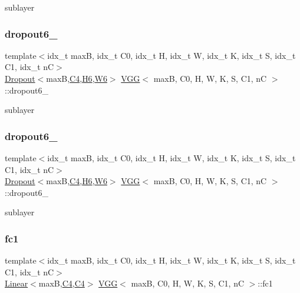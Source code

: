 sublayer \mbox{\label{structVGG_a3ed68e318387ff7e87b1c0d957d8d24a}} 
\subsubsection{\texorpdfstring{dropout6\+\_}{dropout6\_1}}
{\footnotesize\ttfamily template$<$idx\+\_\+t maxB, idx\+\_\+t C0, idx\+\_\+t H, idx\+\_\+t W, idx\+\_\+t K, idx\+\_\+t S, idx\+\_\+t C1, idx\+\_\+t nC$>$ \\
\hyperlink{structDropout}{Dropout}$<$maxB,\hyperlink{structVGG_a4d54a1cc3e99340dfb67e7252719c663}{C4},\hyperlink{structVGG_aca7e136480c1e76d74bda917c1ddca97}{H6},\hyperlink{structVGG_ada7bec62e12fac368b103ae3d8c59c0e}{W6}$>$ \hyperlink{structVGG}{V\+GG}$<$ maxB, C0, H, W, K, S, C1, nC $>$\+::dropout6\+\_}

sublayer \mbox{\label{structVGG_abecd584b5b4bf336077b181e4f3e6f50}} 
\subsubsection{\texorpdfstring{dropout6\+\_}{dropout6\_2}}
{\footnotesize\ttfamily template$<$idx\+\_\+t maxB, idx\+\_\+t C0, idx\+\_\+t H, idx\+\_\+t W, idx\+\_\+t K, idx\+\_\+t S, idx\+\_\+t C1, idx\+\_\+t nC$>$ \\
\hyperlink{structDropout}{Dropout}$<$maxB,\hyperlink{structVGG_a4d54a1cc3e99340dfb67e7252719c663}{C4},\hyperlink{structVGG_aca7e136480c1e76d74bda917c1ddca97}{H6},\hyperlink{structVGG_ada7bec62e12fac368b103ae3d8c59c0e}{W6}$>$ \hyperlink{structVGG}{V\+GG}$<$ maxB, C0, H, W, K, S, C1, nC $>$\+::dropout6\+\_}

sublayer \mbox{\label{structVGG_aca67ef058fa46d4f74022f308c72ad6c}} 
\subsubsection{\texorpdfstring{fc1}{fc1}}
{\footnotesize\ttfamily template$<$idx\+\_\+t maxB, idx\+\_\+t C0, idx\+\_\+t H, idx\+\_\+t W, idx\+\_\+t K, idx\+\_\+t S, idx\+\_\+t C1, idx\+\_\+t nC$>$ \\
\hyperlink{structLinear}{Linear}$<$maxB,\hyperlink{structVGG_a4d54a1cc3e99340dfb67e7252719c663}{C4},\hyperlink{structVGG_a4d54a1cc3e99340dfb67e7252719c663}{C4}$>$ \hyperlink{structVGG}{V\+GG}$<$ maxB, C0, H, W, K, S, C1, nC $>$\+::fc1}

